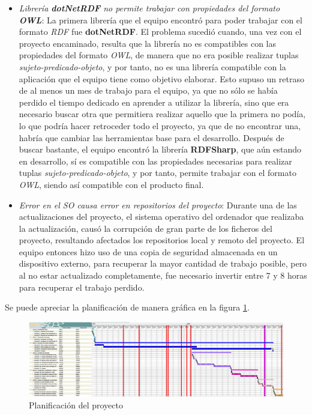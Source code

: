 \begin{itemize}
    \item \textit{Librería \textnormal{\textbf{dotNetRDF}} no permite trabajar con propiedades del formato \textnormal{\textbf{OWL}}}:
    La primera librería que el equipo encontró para poder trabajar con el formato \textit{RDF} fue \textbf{dotNetRDF}. El problema 
    sucedió cuando, una vez con el proyecto encaminado, resulta que la librería no es compatibles con las propiedades del formato \textit{OWL}, 
    de manera que no era posible realizar tuplas \textit{sujeto-predicado-objeto}, y por tanto, no es una librería compatible con la aplicación que 
    el equipo tiene como objetivo elaborar. Esto supuso un retraso de al menos un mes de trabajo para el equipo, ya que no sólo se había perdido 
    el tiempo dedicado en aprender a utilizar la librería, sino que era necesario buscar otra que permitiera realizar aquello que la primera no podía, 
    lo que podría hacer retroceder todo el proyecto, ya que de no encontrar una, habría que cambiar las herramientas base para el desarrollo.
    Después de buscar bastante, el equipo encontró la librería \textbf{RDFSharp}, que aún estando en desarrollo, sí es compatible con las propiedades 
    necesarias para realizar tuplas \textit{sujeto-predicado-objeto}, y por tanto, permite trabajar con el formato \textit{OWL}, siendo así compatible 
    con el producto final.

    \item \textit{Error en el SO causa error en repositorios del proyecto}: Durante una de las actualizaciones del proyecto, el sistema operativo del 
    ordenador que realizaba la actualización, causó la corrupción de gran parte de los ficheros del proyecto, resultando afectados los repositorios local 
    y remoto del proyecto. El equipo entonces hizo uso de una copia de seguridad almacenada en un dispositivo externo, para recuperar la mayor cantidad 
    de trabajo posible, pero al no estar actualizado completamente, fue necesario invertir entre 7 y 8 horas para recuperar el trabajo perdido.
\end{itemize}

Se puede apreciar la planificación de manera gráfica en la figura \ref*{Gantt}.
\begin{landscape}
    \begin{figure}[H]
        \centering
        \includegraphics[scale=0.40]{Project_Planning/ARPEGOS_Gantt.png}
        \caption{Planificación del proyecto}
        \label{Gantt}
    \end{figure}
\end{landscape}








